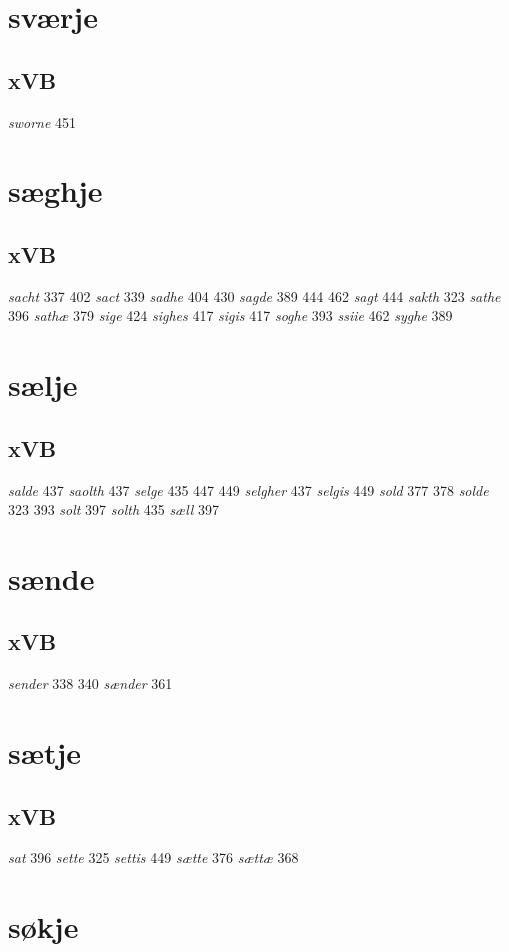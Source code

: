 \documentclass[a4paper,twocolumn]{article}
\begin{document}
\section{sværje}
\label{sec:orgacc7e7a}
\subsection{xVB}
\label{sec:org166d424}
\emph{sworne} 451 
\section{sæghje}
\label{sec:org15d570f}
\subsection{xVB}
\label{sec:orga27eedb}
\emph{sacht} 337 402 \emph{sact} 339 \emph{sadhe} 404 430 \emph{sagde} 389 444 462 \emph{sagt} 444 \emph{sakth} 323 \emph{sathe} 396 \emph{sathæ} 379 \emph{sige} 424 \emph{sighes} 417 \emph{sigis} 417 \emph{soghe} 393 \emph{ssiie} 462 \emph{syghe} 389 
\section{sælje}
\label{sec:org7451653}
\subsection{xVB}
\label{sec:org7d8aeed}
\emph{salde} 437 \emph{saolth} 437 \emph{selge} 435 447 449 \emph{selgher} 437 \emph{selgis} 449 \emph{sold} 377 378 \emph{solde} 323 393 \emph{solt} 397 \emph{solth} 435 \emph{sæll} 397 
\section{sænde}
\label{sec:org80d5a01}
\subsection{xVB}
\label{sec:org6c551e9}
\emph{sender} 338 340 \emph{sænder} 361 
\section{sætje}
\label{sec:orgabb8674}
\subsection{xVB}
\label{sec:org5728344}
\emph{sat} 396 \emph{sette} 325 \emph{settis} 449 \emph{sætte} 376 \emph{sættæ} 368 
\section{søkje}
\label{sec:org6f6c936}
\end{document}
